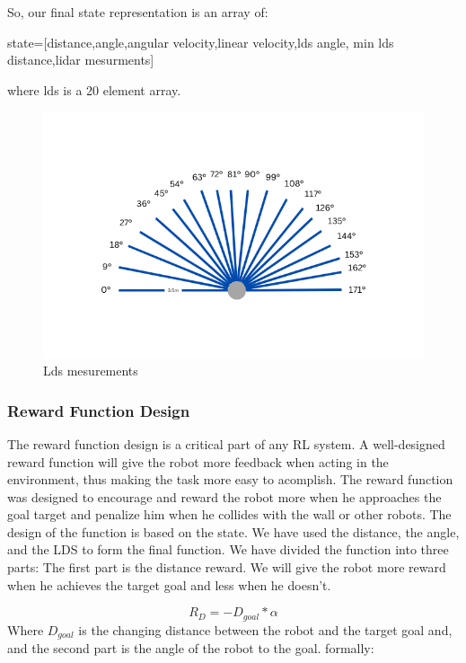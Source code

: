 \documentclass[12pt]{extarticle}
\begin{document}
So, our final state representation is an array of:

state=[distance,angle,angular velocity,linear velocity,lds angle,
min lds distance,lidar mesurments]

where lds is a 20 element array.


 \begin{figure}[H]  
\centering
\includegraphics[scale=0.80]{lds3}
\caption[lds mesurement]{Lds mesurements}
\end{figure}








\subsubsection{Reward Function Design}

The reward function design is a critical part of any RL system. A well-designed reward function will give the robot more feedback when acting in the environment, thus making the task more easy to acomplish.
The reward function was designed to encourage and reward the robot more when he approaches the goal target and penalize him when he collides with the wall or other robots.
The design of the function is based on the state. We have used the distance, the angle, and the LDS to form the final function.
We have divided the function into three parts: The first part is the distance reward. We will give the robot more reward when he achieves the target goal and less when he doesn't.
   
\setcounter{equation}{0}

       \begin{equation} \label{dist_r}
     R_{D}=-D_{goal}*\alpha
   \end{equation}
 Where $D_{goal}$ is the changing distance between the robot and the target goal and, and the second part is the angle of the robot to the goal. formally:
\end{document}

